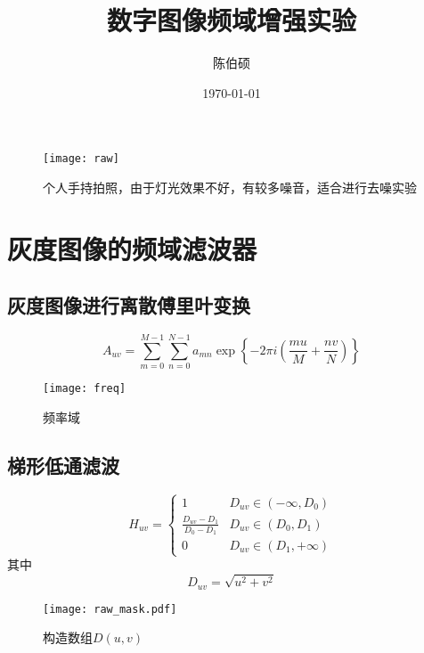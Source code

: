 \documentclass{myreport}
\title{数字图像频域增强实验}
\author{陈伯硕}
\date{\today}
\begin{document}
\maketitle

\begin{figure}[H]
  \centering
  \texttt{[image: raw]}
  \caption{个人手持拍照，由于灯光效果不好，有较多噪音，适合进行去噪实验}
  \label{fig:fish}
\end{figure}
\section{灰度图像的频域滤波器}
  \subsection{灰度图像进行离散傅里叶变换}
    \begin{equation}
      A_{uv} = 
      \sum_{m=0}^{M-1} \sum_{n=0}^{N-1} 
        a_{mn} \exp\left\{
          -2 \pi i \left(
            \frac{mu}{M} + \frac{nv}{N}
          \right)
        \right\}
    \end{equation}
      \begin{figure}[H]
        \centering
        \texttt{[image: freq]}
        \caption{频率域}
        \label{fig:freq}
      \end{figure}
    \subsection{梯形低通滤波}
      \begin{equation}
        H_{uv} = \begin{cases}
        1 & D_{uv} \in (-\infty,D_0) \\
        \frac{D_{uv}-D_1}{D_0 - D_1} & D_{uv} \in (D_0, D_1) \\
        0 & D_{uv} \in (D_1,+\infty)
        \end{cases}
      \end{equation}
      其中
      \begin{equation}
        D_{uv} = \sqrt{u^2 + v^2}
      \end{equation}

      \begin{figure}[H]
        \centering
        \texttt{[image: raw\_mask.pdf]}
        \caption{构造数组$D(u,v)$}
        \label{fig:raw_mask.pdf}
      \end{figure}
\end{document}
